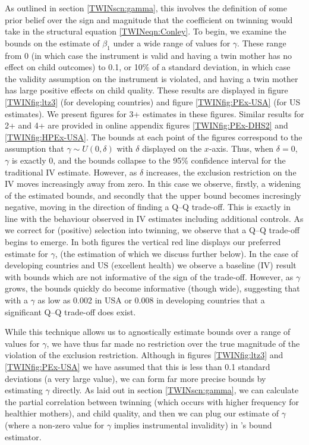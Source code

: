 \documentclass[subeqn]{article}
\begin{document}
\begin{spacing}{1.4}
As outlined in section \ref{TWINscn:gamma}, this involves the definition of some
prior belief over the sign and magnitude that the coefficient on twinning would
take in the structural equation \ref{TWINeqn:Conley}.  To begin, we examine the
bounds on the estimate of $\beta_1$ under a wide range of values for $\gamma$.
These range from 0 (in which case the instrument is valid and having a twin
mother has no effect on child outcomes) to 0.1, or 10\% of a standard deviation,
in which case the validity assumption on the instrument is violated, and having
a twin mother has large positive effects on child quality.  These results are
displayed in figure \ref{TWINfig:ltz3} (for developing countries) and figure
\ref{TWINfig:PEx-USA} (for US estimates).  We present figures for 3+ estimates
in these figures.  Similar results for 2+ and 4+ are provided in online appendix
figures \ref{TWINfig:PEx-DHS2} and \ref{TWINfig:HPEx-USA}.  The bounds at each
point of the figures correspond to the assumption that $\gamma\sim U(0,\delta)$
with $\delta$ displayed on the $x$-axis.  Thus, when $\delta=0$, $\gamma$ is
exactly 0, and the bounds collapse to the 95\% confidence interval for the
traditional IV estimate.  However, as $\delta$ increases, the exclusion
restriction on the IV moves increasingly away from zero.  In this case we
observe, firstly, a widening of the estimated bounds, and secondly that the
upper bound becomes incresingly negative, moving in the direction of finding
a Q--Q trade-off.  This is exactly in line with the behaviour observed in IV
estimates including additional controls.  As we correct for (positive)
selection into twinning, we observe that a Q--Q trade-off begins to emerge.
In both figures the vertical red line displays our preferred estimate for
$\gamma$, (the estimation of which we discuss further below).  In the case
of developing countries and US (excellent health) we observe a baseline (IV)
result with bounds which are not informative of the sign of the trade-off.
However, as $\gamma$ grows, the bounds quickly do become informative (though
wide), suggesting that with a $\gamma$ as low as 0.002 in USA or 0.008 in
developing countries that a significant Q--Q trade-off does exist.

While this technique allows us to agnostically estimate bounds over a range 
of values for $\gamma$, we have thus far made no restriction over the true 
magnitude of the violation of the exclusion restriction.  Although in figures
\ref{TWINfig:ltz3} and \ref{TWINfig:PEx-USA} we have assumed that this is less
than 0.1 standard deviations (a very large value), we can form far more
precise bounds by estimating $\gamma$ directly.  As laid out in section
\ref{TWINscn:gamma}, we can calculate the partial correlation between twinning
(which occurs with higher frequency for healthier mothers), and child quality,
and then we can plug our estimate of $\gamma$ (where a non-zero value for
$\gamma$ implies instrumental invalidity) in \citeauthor{Conleyetal2012}'s bound
estimator.


\end{spacing}
\end{document}
